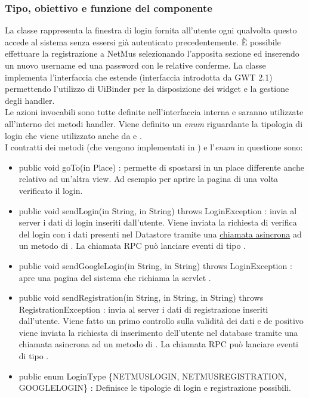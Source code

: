 \subsubsection*{Tipo, obiettivo e funzione del componente}
La classe  rappresenta la finestra di login fornita all'utente
ogni qualvolta questo accede al sistema senza essersi gi\`a autenticato
precedentemente. \`E possibile effettuare la registrazione a NetMus
selezionando l'apposita sezione ed inserendo un nuovo username ed una password
con le relative conferme. La classe  implementa l'interfaccia
 che estende  (interfaccia introdotta da GWT 2.1)
permettendo l'utilizzo di UiBinder per la disposizione dei widget e la gestione
degli handler. \\
Le azioni invocabili
sono tutte definite nell'interfaccia interna
 e saranno utilizzate all'interno dei metodi handler. Viene
definito un \emph{enum} riguardante la tipologia di login che viene utilizzato
anche da  e . \\ I contratti dei metodi (che vengono
implementati in ) e l'\emph{enum} in questione sono:
\begin{itemize}
  \item public void goTo(in Place) : permette di spostarsi in un
  place differente anche relativo ad un'altra view. Ad esempio per aprire la pagina di
   una volta verificato il login.
  \item public void sendLogin(in String, in String) throws  LoginException
  : invia al server i dati di login inseriti
  dall'utente. Viene inviata la richiesta di verifica del login con i dati
  presenti nel Datastore tramite una \underline{chiamata asincrona} ad un metodo
  di . La chiamata RPC pu\`o lanciare eventi di tipo
  .
  \item public void sendGoogleLogin(in String, in String)
  throws LoginException : apre una pagina del sistema che richiama la servlet
  .
  \item public void sendRegistration(in String, in String, in String)
  throws RegistrationException : invia al server i dati di registrazione inseriti
  dall'utente. Viene fatto un primo controllo sulla validit\`a dei dati e de
  positivo viene inviata la richiesta di inserimento dell'utente nel database
  tramite una chiamata asincrona ad un metodo di . La chiamata
  RPC pu\`o lanciare eventi di tipo .
  \item public enum LoginType \{NETMUSLOGIN, NETMUSREGISTRATION,
  GOOGLELOGIN\} : Definisce le tipologie di login e registrazione possibili.
\end{itemize}

